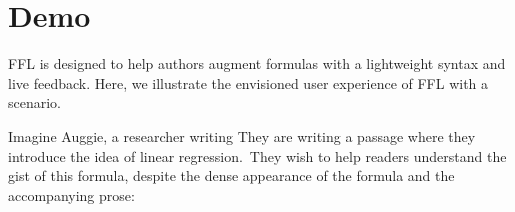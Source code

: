 \section{Demo}\label{Demo} %


FFL is designed to help authors augment formulas with a lightweight syntax and live feedback. Here, we illustrate the envisioned user experience of FFL with a scenario.


Imagine Auggie, a researcher writing  They are writing a passage where they introduce the idea of linear regression.\footnotemark\ They wish to help readers understand the gist of this formula, despite the dense appearance of the formula and the accompanying prose: \\



